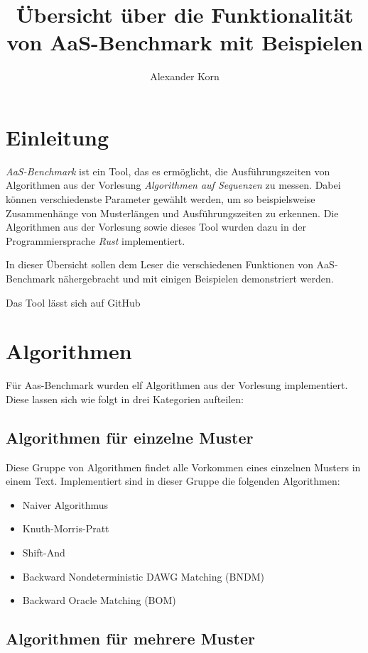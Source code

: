 \documentclass[twocolumn]{article}
\title{\Large \textbf{Übersicht über die Funktionalität von AaS-Benchmark mit Beispielen}}
\author{Alexander Korn}
\date{}
\begin{document}
\maketitle

\tableofcontents

\section{Einleitung}

\textit{AaS-Benchmark} ist ein Tool, das es ermöglicht, die Ausführungszeiten von Algorithmen aus der Vorlesung \textit{Algorithmen auf Sequenzen} zu messen. Dabei können verschiedenste Parameter gewählt werden, um so beispielsweise Zusammenhänge von Musterlängen und Ausführungszeiten zu erkennen. Die Algorithmen aus der Vorlesung sowie dieses Tool wurden dazu in der Programmiersprache \textit{Rust} implementiert.

In dieser Übersicht sollen dem Leser die verschiedenen Funktionen von AaS-Benchmark nähergebracht und mit einigen Beispielen demonstriert werden.

Das Tool lässt sich auf GitHub 

\section{Algorithmen}

Für Aas-Benchmark wurden elf Algorithmen aus der Vorlesung implementiert. Diese lassen sich wie folgt in drei Kategorien aufteilen:

\subsection{Algorithmen für einzelne Muster}

Diese Gruppe von Algorithmen findet alle Vorkommen eines einzelnen Musters in einem Text. Implementiert sind in dieser Gruppe die folgenden Algorithmen:

\begin{itemize}
    \item Naiver Algorithmus
    \item Knuth-Morris-Pratt
    \item Shift-And
    \item Backward Nondeterministic DAWG Matching (BNDM)
    \item Backward Oracle Matching (BOM)
\end{itemize}

\subsection{Algorithmen für mehrere Muster}
\end{document}
